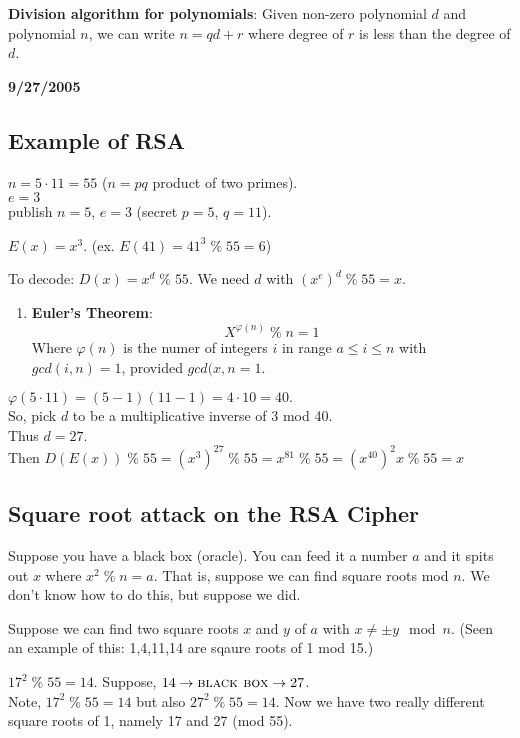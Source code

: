 \textbf{Division algorithm for polynomials}: Given non-zero polynomial $d$ and polynomial $n$, we can write $n = qd+r$ where degree of $r$ is less than the degree of $d$.


\textbf{9/27/2005}

\subsection*{Example of RSA}
$n = 5 \cdot 11 = 55$ ($n = pq$ product of two primes).\\
$e = 3$\\
publish $n = 5$, $e = 3$ (secret $p=5$, $q=11$).

$E(x) = x^3$. (ex. $E(41) = 41^3 \;\%\; 55 = 6$)

To decode: $D(x) = x^d \;\%\; 55$. We need $d$ with $(x^e)^d \;\%\; 55 = x$.

\begin{enumerate}\item[]
\textbf{Euler's Theorem}:
\[
X^{\varphi(n)} \;\%\; n = 1
\]
Where $\varphi(n)$ is the numer of integers $i$ in range $a \leq i \leq n$ with $gcd(i,n) = 1$, provided $gcd(x,n = 1$.
\end{enumerate}

$\varphi(5 \cdot 11) = (5-1)(11-1) = 4 \cdot 10 = 40.$\\
So, pick $d$ to be a multiplicative inverse of 3 mod 40. \\
Thus $d = 27$.\\
Then $D(E(x)) \;\%\; 55 = (x^3)^{27} \;\%\; 55 = x^{81} \;\%\; 55 = (x^{40})^2 x \;\%\; 55 = x$

\subsection*{Square root attack on the RSA Cipher}

Suppose you have a black box (oracle). You can feed it a number $a$ and it spits out $x$ where $x^2 \;\%\; n = a$. That is, suppose we can find square roots mod $n$. We don't know how to do this, but suppose we did.

Suppose we can find two square roots $x$ and $y$ of $a$ with $x \neq \pm y \mod n$. (Seen an example of this: 1,4,11,14 are sqaure roots of 1 mod 15.)

$17^2 \;\%\; 55 = 14$. Suppose, $14 \rightarrow \mbox{\textsc{black box}} \rightarrow 27$. \\
Note, $17^2 \;\%\; 55 = 14$ but also $27^2 \;\%\; 55 = 14$. Now we have two really different square roots of 1, namely 17 and 27 (mod 55).

